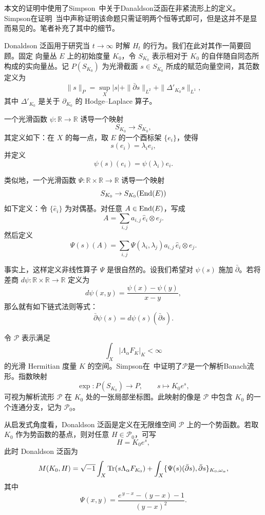 
\chapter{}
本文的证明中使用了Simpson~\cite[Section~5]{Si1}中关于Danaldson泛函在非紧流形上的定义。Simpson在证明~\cite[Proposition~5.1]{Si1}当中声称证明该命题只需证明两个恒等式即可，但是这并不是显而易见的。笔者补充了其中的细节。

Donaldson 泛函用于研究当 \(t\to\infty\) 时解 \(H_t\) 的行为。我们在此对其作一简要回顾。固定 向量丛 \(E\) 上的初始度量 \(K_0\)，令 \(S_{K_0}\) 表示相对于 \(K_0\) 的自伴随自同态所构成的实向量丛。记 \(P(S_{K_0})\) 为光滑截面 \(s\in S_{K_0}\) 所成的赋范向量空间，其范数定义为
\[
\|s\|_P=\sup_X |s|+\|\bar\partial s\|_{L^2}+\|\Delta'_{K_0}s\|_{L^1},
\]
其中 \(\Delta'_{K_0}\) 是关于 \(\partial_{K_0}\) 的 Hodge--Laplace 算子。

一个光滑函数 \(\psi:\mathbb{R}\to\mathbb{R}\) 诱导一个映射
\[
S_{K_0}\to S_{K_0},
\]
其定义如下：在 \(X\) 的每一点，取 \(E\) 的一个酉标架 \(\{e_i\}\)，使得
\[
s(e_i)=\lambda_i e_i,
\]
并定义
\[
\psi(s)(e_i)=\psi(\lambda_i)e_i.
\]

类似地，一个光滑函数 \(\Psi:\mathbb{R}\times\mathbb{R}\to\mathbb{R}\) 诱导一个映射
\[
S_{K_0}\to S_{K_0}(\operatorname{End}(E))
\]
如下定义：令 \(\{\hat e_i\}\) 为对偶基。对任意 \(A\in \operatorname{End}(E)\)，写成
\[
A=\sum_{i,j} a_{i,j}\,\hat e_i\otimes e_j.
\]
然后定义
\[
\Psi(s)(A)=\sum_{i,j}\Psi(\lambda_i,\lambda_j)a_{i,j}\,\hat e_i\otimes e_j.
\]

事实上，这样定义非线性算子 \(\Psi\) 是很自然的。设我们希望对 \(\psi(s)\) 施加 \(\bar\partial\)。若将差商 \(d\psi:\mathbb{R}\times\mathbb{R}\to\mathbb{R}\) 定义为
\[
d\psi(x,y)=\frac{\psi(x)-\psi(y)}{x-y},
\]
那么就有如下链式法则等式：
\[
\bar\partial\psi(s)=d\psi(s)(\bar\partial s). 
\]

令 \(\mathcal P\) 表示满足
\[
\int_X |\Lambda_\alpha F_K|_K<\infty
\]
的光滑 Hermitian 度量 \(K\) 的空间。Simpson在~\cite[Section~4]{Si1}中证明了$\mathcal P$是一个解析Banach流形。指数映射
\[
\exp:P(S_{K_0})\to P,\qquad s\mapsto K_0e^s,
\]
可视为解析流形 \(\mathcal P\) 在 \(K_0\) 处的一张局部坐标图。此映射的像是 \(\mathcal P\) 中包含 \(K_0\) 的一个连通分支，记为 \(\mathcal{P}_0\)。

从启发式角度看，Donaldson 泛函是定义在无限维空间 \(\mathcal P\) 上的一个势函数。若取 \(K_0\) 作为势函数的基点，则对任意 \(H\in \mathcal{P}_0\)，可写
\[
H=K_0e^s,
\]
此时 Donaldson 泛函为
\[
M(K_0,H)
=
\sqrt{-1}\int_X \operatorname{Tr}(s\Lambda_\alpha F_{K_0})
+\int_X \{\Psi(s)(\bar\partial s),\bar\partial s\}_{K_0,\omega_\alpha},
\]
其中
\[
\Psi(x,y)=\frac{e^{\,y-x}-(y-x)-1}{(y-x)^2}.
\]

